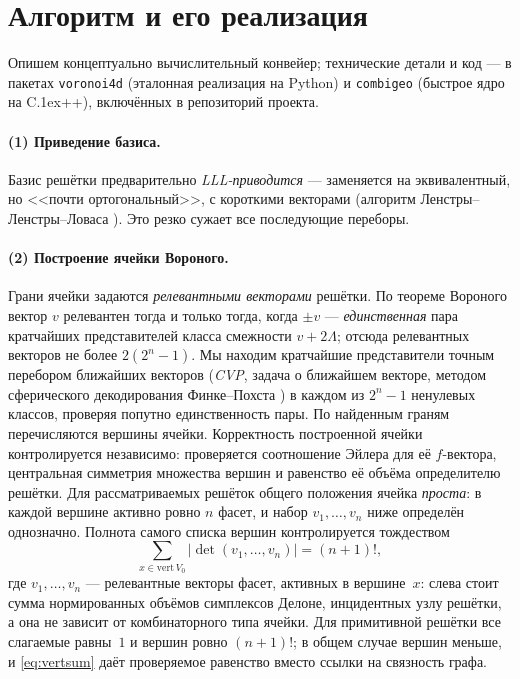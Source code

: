 \section{Алгоритм и его реализация}\label{sec:algo}

Опишем концептуально вычислительный конвейер; технические детали и код --- в
пакетах \texttt{voronoi4d} (эталонная реализация на Python) и \texttt{combigeo}
(быстрое ядро на C\raise.1ex\hbox{\small++}), включённых в репозиторий проекта.

\paragraph{(1) Приведение базиса.} Базис решётки предварительно
\emph{LLL-приводится} --- заменяется на эквивалентный, но <<почти
ортогональный>>, с короткими векторами (алгоритм Ленстры--Ленстры--Ловаса
\cite{LLL}). Это резко сужает все последующие переборы.

\paragraph{(2) Построение ячейки Вороного.} Грани ячейки задаются
\emph{релевантными векторами} решётки. По теореме Вороного вектор $v$
релевантен тогда и только тогда, когда $\pm v$ --- \emph{единственная} пара
кратчайших представителей класса смежности $v+2\Lambda$; отсюда релевантных
векторов не более $2(2^n-1)$. Мы находим кратчайшие представители точным
перебором ближайших векторов (\emph{CVP}, задача о ближайшем векторе, методом
сферического декодирования Финке--Похста \cite{FinckePohst}) в каждом из
$2^n-1$ ненулевых классов, проверяя попутно единственность пары. По найденным
граням перечисляются вершины ячейки. Корректность построенной ячейки
контролируется независимо: проверяется соотношение Эйлера для её $f$-вектора,
центральная симметрия множества вершин и равенство её объёма определителю
решётки. Для рассматриваемых решёток общего положения ячейка \emph{проста}: в
каждой вершине активно ровно $n$ фасет, и набор $v_1,\dots,v_n$ ниже определён
однозначно. Полнота самого списка вершин контролируется тождеством
\begin{equation}\label{eq:vertsum}
\sum_{x\in\mathrm{vert}\,V_0}\bigl|\det(v_1,\dots,v_n)\bigr|=(n+1)!,
\end{equation}
где $v_1,\dots,v_n$ --- релевантные векторы фасет, активных в вершине~$x$: слева
стоит сумма нормированных объёмов симплексов Делоне, инцидентных узлу решётки, а
она не зависит от комбинаторного типа ячейки. Для примитивной решётки все
слагаемые равны~$1$ и вершин ровно $(n+1)!$; в общем случае вершин меньше, и
\eqref{eq:vertsum} даёт проверяемое равенство вместо ссылки на связность графа.

